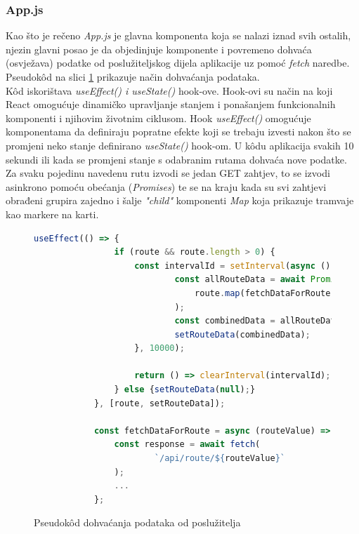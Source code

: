 \documentclass[zavrsnirad]{fer}
\begin{document}
\subsubsection{App.js}
Kao što je rečeno \textit{App.js} je glavna komponenta koja se nalazi iznad svih ostalih, njezin glavni posao je da objedinjuje komponente i povremeno dohvaća (osvježava) podatke od poslužiteljskog dijela aplikacije uz pomoć \textit{fetch} naredbe. Pseudok\^od na slici \ref{slk:dohvatpodataka} prikazuje način dohvaćanja podataka.\\ K\^od iskorištava \textit{useEffect() i useState()} hook-ove. Hook-ovi su način na koji React omogućuje dinamičko upravljanje stanjem i ponašanjem funkcionalnih komponenti i njihovim životnim ciklusom. Hook \textit{useEffect()} omogućuje komponentama da definiraju popratne efekte koji se trebaju izvesti nakon što se promjeni neko stanje definirano \textit{useState()} hook-om. U k\^odu aplikacija svakih 10 sekundi ili kada se promjeni stanje s odabranim rutama dohvaća nove podatke. Za svaku pojedinu navedenu rutu izvodi se jedan GET zahtjev, to se izvodi asinkrono pomoću obećanja (\textit{Promises}) te se na kraju kada su svi zahtjevi obrađeni grupira zajedno i šalje \textit{"child"} komponenti \textit{Map} koja prikazuje tramvaje kao markere na karti.


\begin{figure}[H]
	\centering
	\begin{minipage}{0.9\linewidth}
		\begin{lstlisting}[language=JavaScript]			
			useEffect(() => {
				if (route && route.length > 0) {
					const intervalId = setInterval(async () => {
							const allRouteData = await Promise.all(
								route.map(fetchDataForRoute)
							);
							const combinedData = allRouteData.flat();
							setRouteData(combinedData);
					}, 10000);
					
					return () => clearInterval(intervalId);
				} else {setRouteData(null);}
			}, [route, setRouteData]);
			
			const fetchDataForRoute = async (routeValue) => {
				const response = await fetch(
						`/api/route/${routeValue}`
				);
				...
			};
		\end{lstlisting}
	\end{minipage}
	\caption{Pseudok\^od dohvaćanja podataka od poslužitelja}
	\label{slk:dohvatpodataka}
\end{figure}
\end{document}
